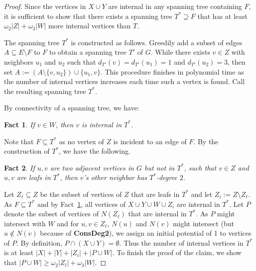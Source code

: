 \documentclass{llncs}
\newcommand{\longversion}[1]{#1}
\newtheorem{fact}{Fact}
\begin{document}
\longversion{
\begin{proof}
 Since the vertices in $X\cup Y$ are internal in any spanning tree containing $F$, it is sufficient to show that there exists a spanning tree $T^* \supseteq F$ that has at least $\omega_2 |Z|+\omega_3 |W|$ more internal vertices than $T$.
 
 The spanning tree $T^*$ is constructed as follows. Greedily add a subset of edges $A \subseteq E\setminus F$ to $F$ to obtain a spanning tree $T'$ of
$G$. While there exists $v\in Z$ with neighbors $u_1$ and $u_2$ such that $d_{T'}(v)=d_{T'}(u_1)=1$ and $d_{T'}(u_2)=3$, then set $A:=(A \setminus
\{v,u_2\}) \cup \{u_1,v\}$. This procedure finishes in polynomial time as the number of 
internal vertices increases each time such a vertex is found. Call the resulting spanning tree $T^*$.

 By connectivity of a spanning tree, we have:
\begin{fact}\label{fact1}
 If $v \in W$, then $v$ is internal in $T^*$.
\end{fact}
 Note that $F \subseteq T^*$ as no vertex of $Z$ is incident to an edge of $F$. By the construction of $T^*$, we have the following.
\begin{fact}\label{fact3}
 If $u,v$ are two adjacent vertices in $G$ but not in $T^\ast$, such that $v\in Z$ and $u,v$ are leafs in $T^*$, then $v$'s other neighbor has
$T^*$-degree $2$.
\end{fact}

Let $Z_\ell \subseteq Z$ be the subset of vertices of $Z$ that are leafs in $T^*$ and let $Z_i := Z \setminus Z_\ell$. As $F \subseteq T^*$ and by
Fact~\ref{fact1}, 
all vertices of $X\cup Y\cup W\cup Z_i$ are internal in $T^*$.
Let $P$ denote the subset of vertices of $N(Z_\ell)$ that are internal in $T^*$. As $P$ might intersect with $W$ and for $u,v\in Z_\ell$, $N(u)$ 
and $N(v)$ might intersect (but $u \not \in N(v)$ because of \textbf{ConsDeg2}), we assign an initial potential of 1 to vertices of $P$. By
definition, $P \cap (X\cup Y) = \emptyset$. Thus the number of internal vertices in $T^*$ is at least $|X|+|Y|+|Z_i|+|P \cup W|$. To finish the proof
of the claim, we show that $|P \cup W|\ge \omega_2|Z_l|+\omega_3|W|$. 


\end{proof}}
\end{document}
